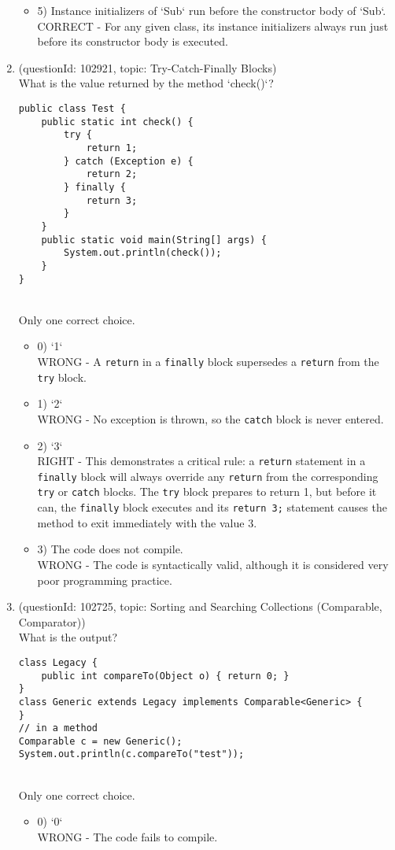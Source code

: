 \documentclass[12pt]{article}
\begin{document}
\begin{enumerate}[label=(\arabic*)]
\begin{itemize}
\item 5) Instance initializers of `Sub` run before the constructor body of `Sub`.
 \\ 
CORRECT - For any given class, its instance initializers always run just before its constructor body is executed.

\end{itemize}
\item (questionId: 102921, topic: Try-Catch-Finally Blocks) \\ 
What is the value returned by the method `check()`?
\begin{verbatim}
public class Test {
    public static int check() {
        try {
            return 1;
        } catch (Exception e) {
            return 2;
        } finally {
            return 3;
        }
    }
    public static void main(String[] args) {
        System.out.println(check());
    }
}
\end{verbatim}
\\ \noindent Only one correct choice. 
\begin{itemize}
\item 0) `1`
 \\ 
WRONG - A \verb|return| in a \verb|finally| block supersedes a \verb|return| from the \verb|try| block.

\item 1) `2`
 \\ 
WRONG - No exception is thrown, so the \verb|catch| block is never entered.

\item 2) `3`
 \\ 
RIGHT - This demonstrates a critical rule: a \verb|return| statement in a \verb|finally| block will always override any \verb|return| from the corresponding \verb|try| or \verb|catch| blocks. The \verb|try| block prepares to return 1, but before it can, the \verb|finally| block executes and its \verb|return 3;| statement causes the method to exit immediately with the value 3.

\item 3) The code does not compile.
 \\ 
WRONG - The code is syntactically valid, although it is considered very poor programming practice.

\end{itemize}
\item (questionId: 102725, topic: Sorting and Searching Collections (Comparable, Comparator)) \\ 
What is the output?
\begin{verbatim}
class Legacy {
    public int compareTo(Object o) { return 0; }
}
class Generic extends Legacy implements Comparable<Generic> {
}
// in a method
Comparable c = new Generic();
System.out.println(c.compareTo("test"));
\end{verbatim}
\\ \noindent Only one correct choice. 
\begin{itemize}
\item 0) `0`
 \\ 
WRONG - The code fails to compile.


\end{itemize}
\end{enumerate}
\end{document}
